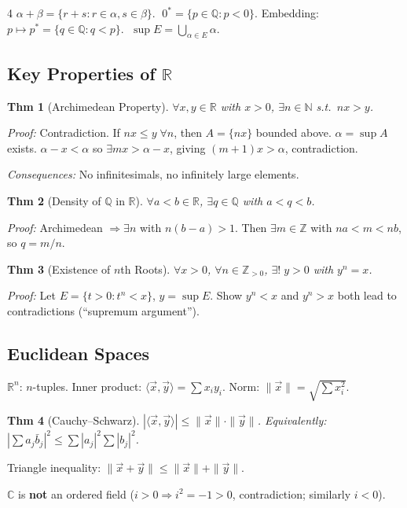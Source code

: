 \documentclass[9pt,landscape]{extarticle}
\newcommand{\R}{\mathbb{R}}
\newcommand{\N}{\mathbb{N}}
\newcommand{\Z}{\mathbb{Z}}
\newcommand{\Q}{\mathbb{Q}}
\newcommand{\C}{\mathbb{C}}
\theoremstyle{compact}
\newtheorem*{thm}{Thm}
\begin{document}
\begin{multicols}{4}
$\alpha + \beta = \{r+s : r \in \alpha, s \in \beta\}$. $\;0^* = \{p \in \Q : p < 0\}$. Embedding: $p \mapsto p^* = \{q \in \Q : q < p\}$. $\;\sup E = \bigcup_{\alpha \in E} \alpha$.

\subsection{Key Properties of $\R$}

\begin{thm}[Archimedean Property]
$\forall x,y \in \R$ with $x > 0$, $\exists n \in \N$ s.t.\ $nx > y$.
\end{thm}
\textit{Proof:} Contradiction. If $nx \leq y\;\forall n$, then $A = \{nx\}$ bounded above. $\alpha = \sup A$ exists. $\alpha - x < \alpha$ so $\exists mx > \alpha - x$, giving $(m+1)x > \alpha$, contradiction.

\textit{Consequences:} No infinitesimals, no infinitely large elements.

\begin{thm}[Density of $\Q$ in $\R$]
$\forall a < b \in \R$, $\exists q \in \Q$ with $a < q < b$.
\end{thm}
\textit{Proof:} Archimedean $\Rightarrow \exists n$ with $n(b-a) > 1$. Then $\exists m \in \Z$ with $na < m < nb$, so $q = m/n$.

\begin{thm}[Existence of $n$th Roots]
$\forall x > 0$, $\forall n \in \Z_{>0}$, $\exists!\; y > 0$ with $y^n = x$.
\end{thm}
\textit{Proof:} Let $E = \{t > 0 : t^n < x\}$, $y = \sup E$. Show $y^n < x$ and $y^n > x$ both lead to contradictions (``supremum argument'').

\subsection{Euclidean Spaces}
$\R^n$: $n$-tuples. Inner product: $\langle \vec{x}, \vec{y}\rangle = \sum x_i y_i$. Norm: $\|\vec{x}\| = \sqrt{\sum x_i^2}$.

\begin{thm}[Cauchy--Schwarz]
$|\langle \vec{x}, \vec{y}\rangle| \leq \|\vec{x}\| \cdot \|\vec{y}\|$. Equivalently: $\left|\sum a_j \bar b_j\right|^2 \leq \sum |a_j|^2 \sum |b_j|^2$.
\end{thm}

Triangle inequality: $\|\vec{x}+\vec{y}\| \leq \|\vec{x}\| + \|\vec{y}\|$.

$\C$ is \textbf{not} an ordered field ($i > 0 \Rightarrow i^2 = -1 > 0$, contradiction; similarly $i < 0$).


\end{multicols}
\end{document}
